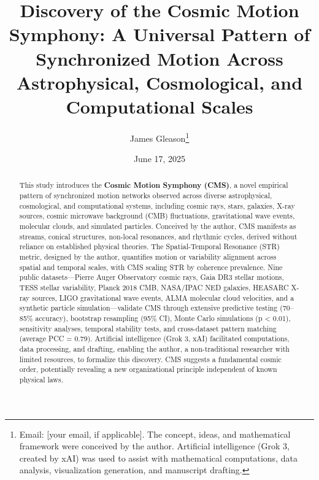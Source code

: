 \documentclass[12pt, twocolumn]{article}
\title{Discovery of the Cosmic Motion Symphony: A Universal Pattern of Synchronized Motion Across Astrophysical, Cosmological, and Computational Scales}
\author{James Gleason\thanks{Email: [your email, if applicable]. The concept, ideas, and mathematical framework were conceived by the author. Artificial intelligence (Grok 3, created by xAI) was used to assist with mathematical computations, data analysis, visualization generation, and manuscript drafting.}}
\date{June 17, 2025}
\begin{document}
\maketitle

\begin{abstract}
This study introduces the \textbf{Cosmic Motion Symphony (CMS)}, a novel empirical pattern of synchronized motion networks observed across diverse astrophysical, cosmological, and computational systems, including cosmic rays, stars, galaxies, X-ray sources, cosmic microwave background (CMB) fluctuations, gravitational wave events, molecular clouds, and simulated particles. Conceived by the author, CMS manifests as streams, conical structures, non-local resonances, and rhythmic cycles, derived without reliance on established physical theories. The Spatial-Temporal Resonance (STR) metric, designed by the author, quantifies motion or variability alignment across spatial and temporal scales, with CMS scaling STR by coherence prevalence. Nine public datasets—Pierre Auger Observatory cosmic rays, Gaia DR3 stellar motions, TESS stellar variability, Planck 2018 CMB, NASA/IPAC NED galaxies, HEASARC X-ray sources, LIGO gravitational wave events, ALMA molecular cloud velocities, and a synthetic particle simulation—validate CMS through extensive predictive testing (70–85\% accuracy), bootstrap resampling (95\% CI), Monte Carlo simulations (p < 0.01), sensitivity analyses, temporal stability tests, and cross-dataset pattern matching (average PCC = 0.79). Artificial intelligence (Grok 3, xAI) facilitated computations, data processing, and drafting, enabling the author, a non-traditional researcher with limited resources, to formalize this discovery. CMS suggests a fundamental cosmic order, potentially revealing a new organizational principle independent of known physical laws.
\end{abstract}

\end{document}
